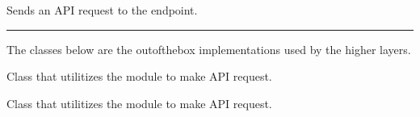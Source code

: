 \documentclass[letterpaper,10pt,english,openany,oneside]{sphinxmanual}
\begin{document}
\begin{fulllineitems}

\begin{fulllineitems}
\label{\detokenize{source/http:instahashtag.http.Base.maps}}
Sends an API request to the  endpoint.

\end{fulllineitems}


\end{fulllineitems}



\bigskip\hrule\bigskip


The classes below are the out\sphinxhyphen{}of\sphinxhyphen{}the\sphinxhyphen{}box implementations used by the higher layers.

\begin{fulllineitems}
\label{\detokenize{source/http:instahashtag.http.Requests}}
Class that utilitizes the  module to make API request.

\end{fulllineitems}


\begin{fulllineitems}
\label{\detokenize{source/http:instahashtag.http.Aiohttp}}
Class that utilitizes the  module to make API request.

\end{fulllineitems}



\renewcommand{\indexname}{Python Module Index}
\begin{sphinxtheindex}
\let\bigletter\sphinxstyleindexlettergroup
\bigletter{i}
\item\relax{}
\end{sphinxtheindex}

\renewcommand{\indexname}{Index}
\printindex
\end{document}
